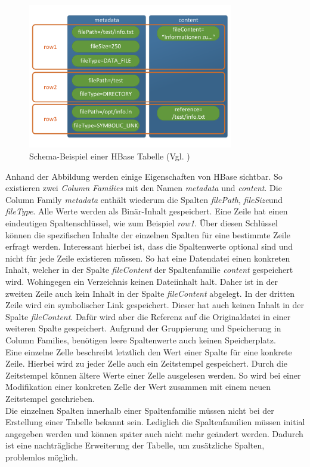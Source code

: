 \begin{figure}[ht]
  \centering
  \includegraphics[width=0.8\textwidth]{./resource/hbase_data_schema_example.pdf}
  \caption{Schema-Beispiel einer HBase Tabelle (Vgl. \cite{big_data_praxis})}
  \label{fig:hbase_schema_example}
\end{figure}

\noindent
Anhand der Abbildung werden einige Eigenschaften von HBase sichtbar. So existieren zwei \textit{Column Families} mit den Namen \textit{metadata} und \textit{content}. Die Column Family \textit{metadata} enthält wiederum die Spalten \textit{filePath}, \textit{fileSize}und \textit{fileType}. Alle Werte werden als Binär-Inhalt gespeichert. Eine Zeile hat einen eindeutigen Spaltenschlüssel, wie zum Beispiel \textit{row1}. 
Über diesen Schlüssel können die spezifischen Inhalte der einzelnen Spalten für eine bestimmte Zeile erfragt werden. Interessant hierbei ist, dass die Spaltenwerte optional sind und nicht für jede Zeile existieren müssen. So hat eine Datendatei einen konkreten Inhalt, welcher in der Spalte \textit{fileContent} der Spaltenfamilie \textit{content} gespeichert wird. Wohingegen ein Verzeichnis keinen Dateiinhalt halt. 
Daher ist in der zweiten Zeile auch kein Inhalt in der Spalte \textit{fileContent} abgelegt. In der dritten Zeile wird ein symbolischer Link gespeichert. Dieser hat auch keinen Inhalt in der Spalte \textit{fileContent}. Dafür wird aber die Referenz auf die Originaldatei in einer weiteren Spalte gespeichert. Aufgrund der Gruppierung und Speicherung in Column Families, benötigen leere Spaltenwerte auch keinen Speicherplatz.\\ 

\noindent
Eine einzelne Zelle beschreibt letztlich den Wert einer Spalte für eine konkrete Zeile. Hierbei wird zu jeder Zelle auch ein Zeitstempel gespeichert. Durch die Zeitstempel können ältere Werte einer Zelle ausgelesen werden. 
So wird bei einer Modifikation einer konkreten Zelle der Wert zusammen mit einem neuen Zeitstempel geschrieben.\\
Die einzelnen Spalten innerhalb einer Spaltenfamilie müssen nicht bei der Erstellung einer Tabelle bekannt sein. Lediglich die Spaltenfamilien müssen initial angegeben werden und können später auch nicht mehr geändert werden. Dadurch ist eine nachträgliche Erweiterung der Tabelle, um zusätzliche Spalten, problemlos möglich.\cite[S. 577]{hadoop_definitive_guide}\\

